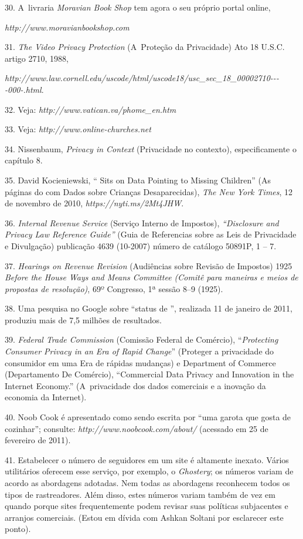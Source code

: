 \begin{Parskip}
30. A~livraria \emph{Moravian Book Shop} tem agora o seu próprio portal
online,

\emph{http://www.moravianbookshop.com}

31. \emph{The Video Privacy Protection} (A~Proteção da Privacidade) Ato
18 U.S.C. artigo 2710, 1988,

\emph{http://www.law.cornell.edu/uscode/html/uscode18/usc\_sec\_18\_00002710-\/-\/-\/-000-.html}.%

32. Veja:
\emph{http://www.vatican.va/phome\_en.htm}

33. Veja:
\emph{http://www.online-churches.net}

34. Nissenbaum, \emph{Privacy in Context} (Privacidade no contexto),
especificamente o capítulo 8.

35. David Kocieniewski, `` Sits on Data Pointing to Missing Children''
(As páginas do  com Dados sobre Crianças Desaparecidas), \emph{The
New York Times}, 12 de novembro de 2010, \emph{https://nyti.ms/2Mt4JHW}.

36. \emph{Internal Revenue Service} (Serviço Interno de Impostos),
\emph{``Disclosure and Privacy Law Reference Guide''} (Guia de
Referencias sobre as Leis de Privacidade e Divulgação) publicação 4639
(10-2007) número de catálogo 50891P, 1 -- 7.

37. \emph{Hearings on Revenue Revision} (Audiências sobre Revisão de
Impostos) 1925 \emph{Before the House Ways and Means Committee (Comitê
para maneiras e meios de propostas de resolução)}, 69º Congresso, 1ª
sessão 8--9 (1925).

38. Uma pesquisa no Google sobre ``status de '', realizada 11 de janeiro
de 2011, produziu mais de 7,5 milhões de resultados.

39. \emph{Federal Trade Commission} (Comissão Federal de Comércio),
``\emph{Protecting Consumer Privacy in an Era of Rapid Change}''
(Proteger a privacidade do consumidor em uma Era de rápidas mudanças) e
Department of Commerce (Departamento De Comércio), ``Commercial Data
Privacy and Innovation in the Internet Economy.'' (A~privacidade dos
dados comerciais e a inovação da economia da Internet).

40. Noob Cook é apresentado como sendo escrita por ``uma garota que gosta
de cozinhar''; consulte:
\emph{http://www.noobcook.com/about/}
(acessado em 25 de fevereiro de 2011).

41. Estabelecer o número de seguidores em um site é altamente inexato.
Vários utilitários oferecem esse serviço, por exemplo, o
\emph{Ghostery}; os números variam de acordo as abordagens adotadas. Nem
todas as abordagens reconhecem todos os tipos de rastreadores. Além
disso, estes números variam também de vez em quando porque sites
frequentemente podem revisar suas políticas subjacentes e arranjos
comerciais. (Estou em dívida com Ashkan Soltani por esclarecer este
ponto).


\end{Parskip}
